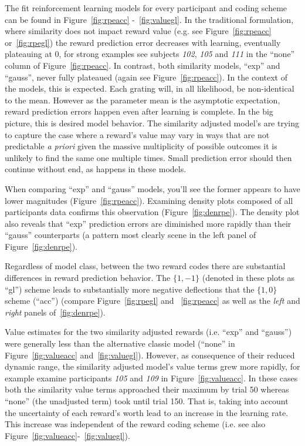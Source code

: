 \documentclass[doc,12pt]{apa}        %
\begin{document}
The fit reinforcement learning models for every participant and coding scheme can be found in Figure~\ref{fig:rpeacc} -~\ref{fig:valuegl}.  In the traditional formulation, where similarity does not impact reward value (e.g. see Figure~\ref{fig:rpeacc} or~\ref{fig:rpegl}) the reward prediction error decreases with learning, eventually plateauing at 0, for strong examples see subjects \emph{102}, \emph{105} and \emph{111} in the ``none'' column of Figure~\ref{fig:rpeacc}.  In contrast, both similarity models, ``exp'' and ``gauss'', never fully plateaued (again see Figure~\ref{fig:rpeacc}).  In the context of the models, this is expected.  Each grating will, in all likelihood, be non-identical to the mean. However as the parameter mean is the asymptotic expectation, reward prediction errors happen even after learning is complete.  In the big picture, this is desired model behavior.  The similarity adjusted model's are trying to capture the case where a reward's value may vary in ways that are not predictable \emph{a priori} given the massive multiplicity of possible outcomes it is unlikely to find the same one multiple times.  Small prediction error should then continue without end, as happens in these models.

When comparing ``exp'' and ``gauss'' models, you'll see the former appears to have lower magnitudes (Figure~\ref{fig:rpeacc}).  Examining density plots composed of all participants data confirms this observation (Figure~\ref{fig:denrpe}).  The density plot also reveals that ``exp'' prediction errors are diminished more rapidly than their ``gauss'' counterparts (a pattern most clearly scene in the left panel of Figure~\ref{fig:denrpe}).  

Regardless of model class, between the two reward codes there are substantial differences in reward prediction behavior.  The $\{1,-1\}$ (denoted in these plots as ``gl'') scheme leads to substantially more negative deflections that the $\{1,0\}$ scheme (``acc'') (compare Figure~\ref{fig:rpegl} and ~\ref{fig:rpeacc} as well as the \emph{left} and \emph{right} panels of~\ref{fig:denrpe}).   

Value estimates for the two similarity adjusted rewards (i.e. ``exp'' and ``gauss'') were generally less than the alternative classic model (``none'' in Figure~\ref{fig:valueacc} and~\ref{fig:valuegl}).  However, as consequence of their reduced dynamic range, the similarity adjusted model's value terms grew more rapidly, for example examine participants \emph{105} and \emph{109} in Figure~\ref{fig:valueacc}.  In these cases both the similarity value terms approached their maximum by trial 50 whereas ``none'' (the unadjusted term) took until trial 150.  That is, taking into account the uncertainty of each reward's worth lead to an increase in the learning rate.  This increase was independent of the reward coding scheme (i.e. see also Figure~\ref{fig:valueacc}-~\ref{fig:valuegl}).  
\end{document}
